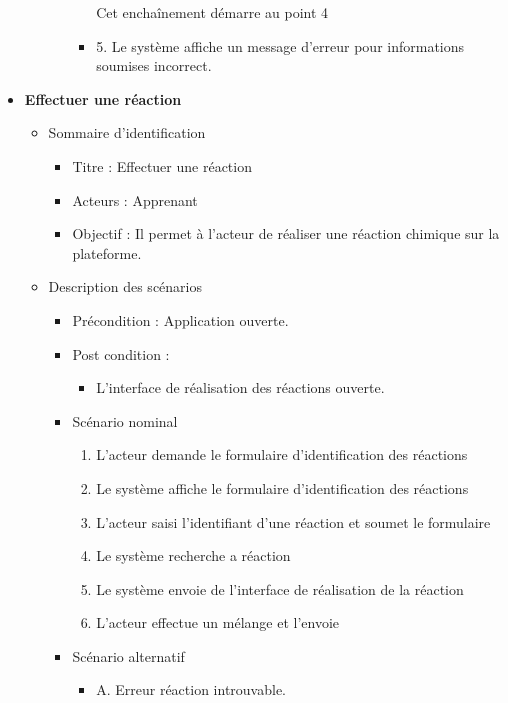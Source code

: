 \begin{itemize}
\begin{itemize}
\begin{itemize}
\begin{itemize}
				                        Cet enchaînement démarre au point 4

				                  \item 5. Le système affiche un message d’erreur pour informations soumises incorrect.
			                  \end{itemize}
		            \end{itemize}
	      \end{itemize}

	\item \textbf{Effectuer une réaction}
	      \begin{itemize}
		      \item Sommaire d’identification
		            \begin{itemize}
			            \item Titre : Effectuer une réaction
			            \item Acteurs : Apprenant
			            \item Objectif : Il permet à l’acteur de réaliser une réaction chimique sur la plateforme.
		            \end{itemize}
		      \item Description des scénarios
		            \begin{itemize}
			            \item Précondition : Application ouverte.
			            \item Post condition :
			                  \begin{itemize}
				                  \item L'interface de réalisation des réactions ouverte.
			                  \end{itemize}
			            \item Scénario nominal
			                  \begin{enumerate}
				                  \item L’acteur demande le formulaire d'identification des réactions
				                  \item Le système affiche le formulaire d'identification des réactions
				                  \item L’acteur saisi l'identifiant d'une réaction et soumet le formulaire
				                  \item Le système recherche a réaction
				                  \item Le système envoie de l'interface de réalisation de la réaction
				                  \item L’acteur effectue un mélange et l’envoie
			                  \end{enumerate}
			            \item Scénario alternatif
			                  \begin{itemize}
				                  \item A. Erreur réaction introuvable.


\end{itemize}
\end{itemize}
\end{itemize}
\end{itemize}
